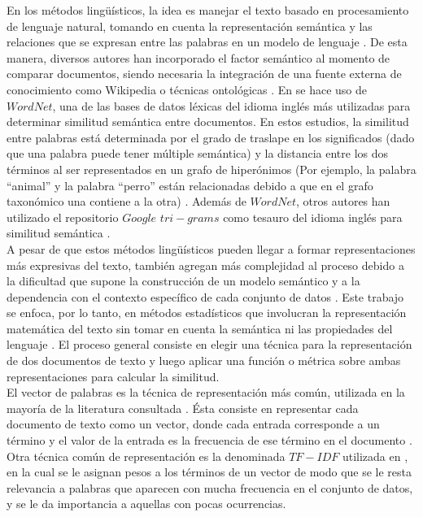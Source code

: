 En los métodos lingüísticos, la idea es manejar el texto basado en procesamiento de lenguaje natural, tomando en cuenta la representación semántica y las relaciones que se expresan entre las palabras en un modelo de lenguaje \cite{srivastava2009text}. De esta manera, diversos autores han incorporado el factor semántico al momento de comparar documentos, siendo necesaria la integración de una fuente externa de conocimiento como Wikipedia o técnicas ontológicas \cite{seifzadeh2015short}. En \cite{lazar2014improving, devraj2015twitter, martinez2014analysis} se hace uso de $WordNet$, una de las bases de datos léxicas del idioma inglés más utilizadas para determinar similitud semántica entre documentos. En estos estudios, la similitud entre palabras está determinada por el grado de traslape en los significados (dado que una palabra puede tener múltiple semántica) y la distancia entre los dos términos al ser representados en un grafo de hiperónimos (Por ejemplo, la palabra “animal” y la palabra “perro” están relacionadas debido a que en el grafo taxonómico una contiene a la otra) \cite{ devraj2015twitter}. Además de $WordNet$, otros autores han utilizado el repositorio $Google$ $tri-grams$ como tesauro del idioma inglés para similitud semántica \cite{davison2014p, soto2015similarity}.\\
A pesar de que estos métodos lingüísticos pueden llegar a formar representaciones más expresivas del texto, también agregan más complejidad al proceso debido a la dificultad que supone la construcción de un modelo semántico y a la dependencia con el contexto específico de cada conjunto de datos \cite{srivastava2009text}. Este trabajo se enfoca, por lo tanto, en métodos estadísticos que involucran la representación matemática del texto sin tomar en cuenta la semántica ni las propiedades del lenguaje \cite{srivastava2009text}. El proceso general consiste en elegir una técnica para la representación de dos documentos de texto y luego aplicar una función o métrica sobre ambas representaciones para calcular la similitud. \\
El vector de palabras es la técnica de representación más común, utilizada en la mayoría de la literatura consultada \cite{aggarwal2015data,soto2015similarity,kumaran2004text,xu2012combining,srivastava2009text, lazar2014improving}. Ésta consiste en representar cada documento de texto como un vector, donde cada entrada corresponde a un término y  el valor de la entrada es la frecuencia de ese término en el documento \cite{aggarwal2015data}. Otra técnica común de representación es la denominada $TF-IDF$ utilizada en \cite{araki2014annotation,soto2015similarity}, en la cual se le asignan pesos a los términos de un vector de modo que se le resta relevancia a palabras que aparecen con mucha frecuencia en el conjunto de datos, y se le da importancia a aquellas con pocas ocurrencias.\\
